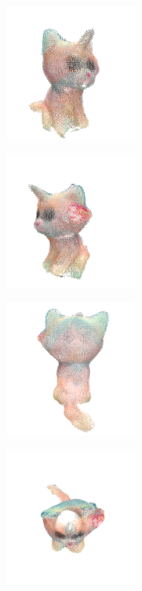 \begin{figure}[h]
    \centering
    \begin{subfigure}[t]{0.2\textheight}
    	\centering
        \includegraphics[height=4.5cm]{archivos/experimentacion-2-resultado-nube.png}
    \end{subfigure}
    \begin{subfigure}[t]{0.2\textheight}
    	\centering
        \includegraphics[height=4.5cm]{archivos/experimentacion-2-resultado-nube-2.png}
    \end{subfigure}
    \begin{subfigure}[t]{0.2\textheight}
    	\centering
        \includegraphics[height=4.5cm]{archivos/experimentacion-2-resultado-nube-3.png}
    \end{subfigure}
    \begin{subfigure}[t]{0.2\textheight}
    	\centering
        \includegraphics[height=4.5cm]{archivos/experimentacion-2-resultado-nube-4.png}

\end{subfigure}
\end{figure}
